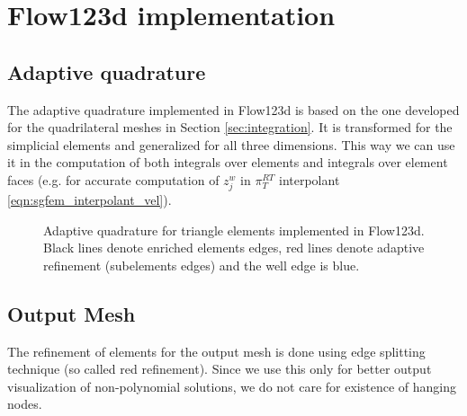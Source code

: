 

\section{Flow123d implementation}

\subsection{Adaptive quadrature}
The adaptive quadrature implemented in Flow123d is based on the one developed for the quadrilateral meshes
in Section \ref{sec:integration}. It is transformed for the simplicial elements and generalized for
all three dimensions. This way we can use it in the computation of both integrals over elements and integrals
over element faces (e.g. for accurate computation of $z^w_j$ in $\pi^{RT}_T$ interpolant \eqref{eqn:sgfem_interpolant_vel}).

\begin{figure}[!htb]
  \centering    
  \hspace{0pt}
  \caption[Adaptive quadrature in Flow123d]
  {Adaptive quadrature for triangle elements implemented in Flow123d.
   Black lines denote enriched elements edges, red lines denote adaptive refinement (subelements edges) and the well
   edge is blue.
  }
  \label{fig:adapt_refinement_flow123d}
\end{figure}

\subsection{Output Mesh}
\label{sec:output_mesh}

The refinement of elements for the output mesh is done using edge splitting technique (so called red refinement).
Since we use this only for better output visualization of non-polynomial solutions, we do not
care for existence of hanging nodes.

